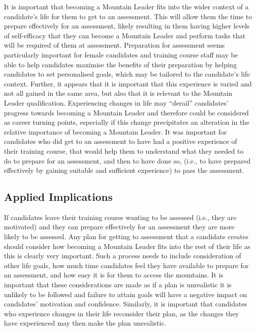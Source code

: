 \documentclass[
  12pt,
  a4paper,
]{book}
\begin{document}
It is important that becoming a Mountain Leader fits into the wider context of a candidate's life for them to get to an assessment. This will allow them the time to prepare effectively for an assessment, likely resulting in them having higher levels of self-efficacy that they can become a Mountain Leader and perform tasks that will be required of them at assessment. Preparation for assessment seems particularly important for female candidates and training course staff may be able to help candidates maximise the benefits of their preparation by helping candidates to set personalised goals, which may be tailored to the candidate's life context. Further, it appears that it is important that this experience is varied and not all gained in the same area, but also that it is relevant to the Mountain Leader qualification. Experiencing changes in life may ``derail'' candidates' progress towards becoming a Mountain Leader and therefore could be considered as career turning points, especially if this change precipitates an alteration in the relative importance of becoming a Mountain Leader. It was important for candidates who did get to an assessment to have had a positive experience of their training course, that would help them to understand what they needed to do to prepare for an assessment, and then to have done so, (i.e., to have prepared effectively by gaining suitable and sufficient experience) to pass the assessment.

\hypertarget{ml-pra-applied-implications}{%
\subsection{Applied Implications}\label{ml-pra-applied-implications}}

If candidates leave their training course wanting to be assessed (i.e., they are motivated) and they can prepare effectively for an assessment they are more likely to be assessed. Any plan for getting to assessment that a candidate creates should consider how becoming a Mountain Leader fits into the rest of their life as this is clearly very important. Such a process needs to include consideration of other life goals, how much time candidates feel they have available to prepare for an assessment, and how easy it is for them to access the mountains. It is important that these considerations are made as if a plan is unrealistic it is unlikely to be followed and failure to attain goals will have a negative impact on candidates' motivation and confidence. Similarly, it is important that candidates who experience changes in their life reconsider their plan, as the changes they have experienced may then make the plan unrealistic.
\end{document}
